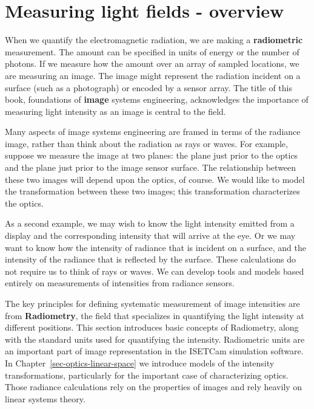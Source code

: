 \documentclass[
  letterpaper,
]{book}
\begin{document}
\section{Measuring light fields -
overview}\label{sec-lfmeasurement-overview}

When we quantify the electromagnetic radiation, we are making a
\textbf{radiometric} measurement. The amount can be specified in units
of energy or the number of photons. If we measure how the amount over an
array of sampled locations, we are measuring an image. The image might
represent the radiation incident on a surface (such as a photograph) or
encoded by a sensor array. The title of this book, foundations of
\textbf{image} systems engineering, acknowledges the importance of
measuring light intensity as an image is central to the field.

Many aspects of image systems engineering are framed in terms of the
radiance image, rather than think about the radiation as rays or waves.
For example, suppose we measure the image at two planes: the plane just
prior to the optics and the plane just prior to the image sensor
surface. The relationship between these two images will depend upon the
optics, of course. We would like to model the transformation between
these two images; this transformation characterizes the optics.

As a second example, we may wish to know the light intensity emitted
from a display and the corresponding intensity that will arrive at the
eye. Or we may want to know how the intensity of radiance that is
incident on a surface, and the intensity of the radiance that is
reflected by the surface. These calculations do not require us to think
of rays or waves. We can develop tools and models based entirely on
measurements of intensities from radiance sensors.

The key principles for defining systematic measurement of image
intensities are from \textbf{Radiometry}, the field that specializes in
quantifying the light intensity at different positions. This section
introduces basic concepts of Radiometry, along with the standard units
used for quantifying the intensity. Radiometric units are an important
part of image representation in the ISETCam simulation software. In
Chapter~\ref{sec-optics-linear-space} we introduce models of the
intensity transformations, particularly for the important case of
characterizing optics. Those radiance calculations rely on the
properties of images and rely heavily on linear systems theory.
\end{document}
